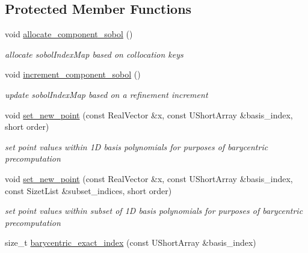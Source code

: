 \subsection*{Protected Member Functions}
\begin{DoxyCompactItemize}
\item 
void \hyperlink{classPecos_1_1SharedHierarchInterpPolyApproxData_a489e05c9d1bc07d7120ce3dfc9a7e66a}{allocate\+\_\+component\+\_\+sobol} ()\label{classPecos_1_1SharedHierarchInterpPolyApproxData_a489e05c9d1bc07d7120ce3dfc9a7e66a}

\begin{DoxyCompactList}\small\item\em allocate sobol\+Index\+Map based on collocation keys \end{DoxyCompactList}\item 
void \hyperlink{classPecos_1_1SharedHierarchInterpPolyApproxData_ae66f3349bfdbb48a266dd09760f4f023}{increment\+\_\+component\+\_\+sobol} ()\label{classPecos_1_1SharedHierarchInterpPolyApproxData_ae66f3349bfdbb48a266dd09760f4f023}

\begin{DoxyCompactList}\small\item\em update sobol\+Index\+Map based on a refinement increment \end{DoxyCompactList}\item 
void \hyperlink{classPecos_1_1SharedHierarchInterpPolyApproxData_a66e56a4893ad9caf1f6be673c3d77128}{set\+\_\+new\+\_\+point} (const Real\+Vector \&x, const U\+Short\+Array \&basis\+\_\+index, short order)\label{classPecos_1_1SharedHierarchInterpPolyApproxData_a66e56a4893ad9caf1f6be673c3d77128}

\begin{DoxyCompactList}\small\item\em set point values within 1D basis polynomials for purposes of barycentric precomputation \end{DoxyCompactList}\item 
void \hyperlink{classPecos_1_1SharedHierarchInterpPolyApproxData_a4de6e6ae6cf7f728ab4f05773015ccaa}{set\+\_\+new\+\_\+point} (const Real\+Vector \&x, const U\+Short\+Array \&basis\+\_\+index, const Sizet\+List \&subset\+\_\+indices, short order)\label{classPecos_1_1SharedHierarchInterpPolyApproxData_a4de6e6ae6cf7f728ab4f05773015ccaa}

\begin{DoxyCompactList}\small\item\em set point values within subset of 1D basis polynomials for purposes of barycentric precomputation \end{DoxyCompactList}\item 
size\+\_\+t \hyperlink{classPecos_1_1SharedHierarchInterpPolyApproxData_a7c23d0f2145a4a2ad61fa7f6f2feb13e}{barycentric\+\_\+exact\+\_\+index} (const U\+Short\+Array \&basis\+\_\+index)\label{classPecos_1_1SharedHierarchInterpPolyApproxData_a7c23d0f2145a4a2ad61fa7f6f2feb13e}


\end{DoxyCompactItemize}
